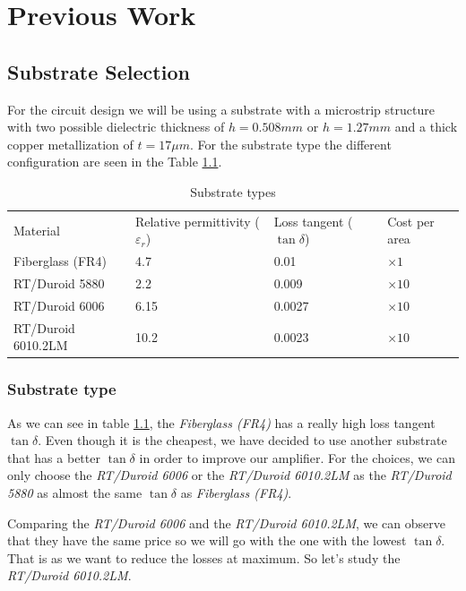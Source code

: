 \documentclass[12pt]{report} %
\let\oldsection\section
\renewcommand\section{\clearpage\oldsection}
\begin{document}
\chapter{Previous Work}
\section{Substrate Selection}

For the circuit design we will be using a substrate with a microstrip structure with two possible dielectric thickness of $h = 0.508 mm$ or $h = 1.27 mm$ and a thick copper metallization of $t = 17 \mu m$. For the substrate type the different configuration are seen in the Table \ref{tab:previous_work:substrate_types}.

\begin{table}[htbp]
    \centering
    \caption{Substrate types}
    \label{tab:previous_work:substrate_types}
    \begin{tabular}{@{}llll@{}}
    Material & Relative permittivity ($\varepsilon_r$) & Loss tangent ($\tan \delta$) & Cost per area \\
    Fiberglass (FR4) & 4.7 & 0.01 & $\times 1$ \\
    RT/Duroid 5880 & 2.2 & 0.009 & $\times 10$ \\
    RT/Duroid 6006 & 6.15 & 0.0027 & $\times 10$ \\
    RT/Duroid 6010.2LM & 10.2 & 0.0023 & $\times 10$ \\
    \end{tabular}
\end{table}

\subsection{Substrate type}

As we can see in table \ref{tab:previous_work:substrate_types}, the \textit{Fiberglass (FR4)} has a really high loss tangent $\tan \delta$. Even though it is the cheapest, we have decided to use another substrate that has a better $\tan \delta$ in order to improve our amplifier. For the choices, we can only choose the \textit{RT/Duroid 6006} or the \textit{RT/Duroid 6010.2LM} as the \textit{RT/Duroid 5880} as almost the same $\tan \delta$ as \textit{Fiberglass (FR4)}.

Comparing the  \textit{RT/Duroid 6006} and the \textit{RT/Duroid 6010.2LM}, we can observe that they have the same price so we will go with the one with the lowest $\tan \delta$. That is as we want to reduce the losses at maximum. So let's study the \textit{RT/Duroid 6010.2LM}. 
\end{document}
